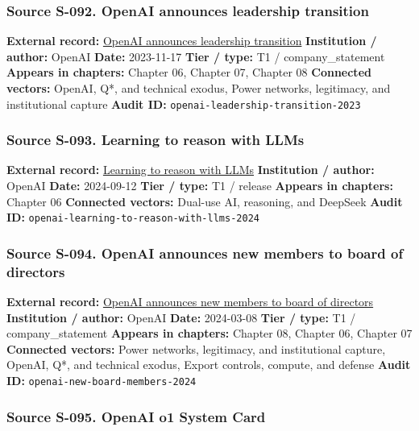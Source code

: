 \documentclass[
  american,
  11pt,
  letterpaper,
]{article}
\begin{document}
\subsubsection{Source S-092. OpenAI announces leadership
transition}\label{source-s-092-openai-announces-leadership-transition}

\textbf{External record:}
\href{https://openai.com/index/openai-announces-leadership-transition/}{OpenAI
announces leadership transition} \textbf{Institution / author:} OpenAI
\textbf{Date:} 2023-11-17 \textbf{Tier / type:} T1 / company\_statement
\textbf{Appears in chapters:} Chapter 06, Chapter 07, Chapter 08
\textbf{Connected vectors:} OpenAI, Q*, and technical exodus, Power
networks, legitimacy, and institutional capture \textbf{Audit ID:}
\texttt{openai-leadership-transition-2023}

\subsubsection{Source S-093. Learning to reason with
LLMs}\label{source-s-093-learning-to-reason-with-llms}

\textbf{External record:}
\href{https://openai.com/index/learning-to-reason-with-llms/}{Learning
to reason with LLMs} \textbf{Institution / author:} OpenAI
\textbf{Date:} 2024-09-12 \textbf{Tier / type:} T1 / release
\textbf{Appears in chapters:} Chapter 06 \textbf{Connected vectors:}
Dual-use AI, reasoning, and DeepSeek \textbf{Audit ID:}
\texttt{openai-learning-to-reason-with-llms-2024}

\subsubsection{Source S-094. OpenAI announces new members to board of
directors}\label{source-s-094-openai-announces-new-members-to-board-of-directors}

\textbf{External record:}
\href{https://openai.com/index/openai-announces-new-members-to-board-of-directors/}{OpenAI
announces new members to board of directors} \textbf{Institution /
author:} OpenAI \textbf{Date:} 2024-03-08 \textbf{Tier / type:} T1 /
company\_statement \textbf{Appears in chapters:} Chapter 08, Chapter 06,
Chapter 07 \textbf{Connected vectors:} Power networks, legitimacy, and
institutional capture, OpenAI, Q*, and technical exodus, Export
controls, compute, and defense \textbf{Audit ID:}
\texttt{openai-new-board-members-2024}

\subsubsection{Source S-095. OpenAI o1 System
Card}\label{source-s-095-openai-o1-system-card}
\end{document}
